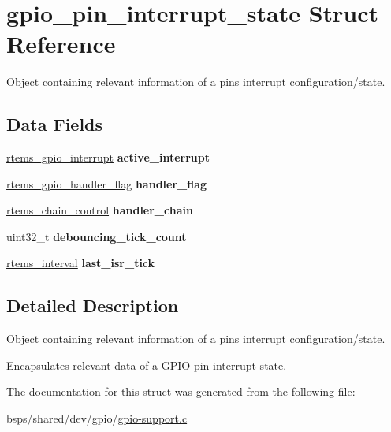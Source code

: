 \hypertarget{structgpio__pin__interrupt__state}{}\section{gpio\+\_\+pin\+\_\+interrupt\+\_\+state Struct Reference}
\label{structgpio__pin__interrupt__state}


Object containing relevant information of a pin\textquotesingle{}s interrupt configuration/state.  


\subsection*{Data Fields}
\begin{DoxyCompactItemize}
\item 
\mbox{\label{structgpio__pin__interrupt__state_a7833fad68c5aaef2e7271c4b4880e074}} 
\mbox{\hyperlink{gpio_8h_a941c7497a28a335b0b05e1ebfd471ddc}{rtems\+\_\+gpio\+\_\+interrupt}} {\bfseries active\+\_\+interrupt}
\item 
\mbox{\label{structgpio__pin__interrupt__state_a02fb4daa90c6e2fbfd2dda270aae311b}} 
\mbox{\hyperlink{gpio_8h_a5c0bd60f2caeb36c424b17c888331b8f}{rtems\+\_\+gpio\+\_\+handler\+\_\+flag}} {\bfseries handler\+\_\+flag}
\item 
\mbox{\label{structgpio__pin__interrupt__state_a33ee62536332188b3cab65e21edc31f3}} 
\mbox{\hyperlink{unionChain__Control}{rtems\+\_\+chain\+\_\+control}} {\bfseries handler\+\_\+chain}
\item 
\mbox{\label{structgpio__pin__interrupt__state_a7d9c85edd077eb52d42958a907c39c2a}} 
uint32\+\_\+t {\bfseries debouncing\+\_\+tick\+\_\+count}
\item 
\mbox{\label{structgpio__pin__interrupt__state_a341e464a7ef233397e0567656edb5aeb}} 
\mbox{\hyperlink{group__ClassicTasks_gad39c43f949683d46874e3a5586b93aee}{rtems\+\_\+interval}} {\bfseries last\+\_\+isr\+\_\+tick}
\end{DoxyCompactItemize}


\subsection{Detailed Description}
Object containing relevant information of a pin\textquotesingle{}s interrupt configuration/state. 

Encapsulates relevant data of a G\+P\+IO pin interrupt state. 

The documentation for this struct was generated from the following file\+:\begin{DoxyCompactItemize}
\item 
bsps/shared/dev/gpio/\mbox{\hyperlink{gpio-support_8c}{gpio-\/support.\+c}}\end{DoxyCompactItemize}
